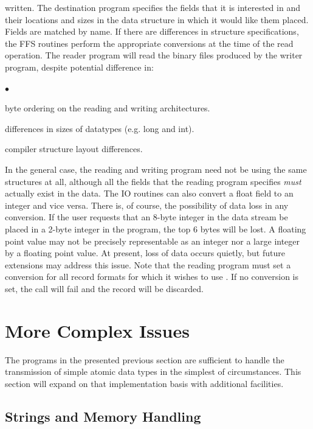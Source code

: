written.  The destination program specifies the fields that it is interested
in and their locations and sizes in the data structure in which it would like
them placed. Fields are matched by name.  If there are differences in
structure specifications, the FFS routines perform the appropriate
conversions at the time of the read operation.  The reader program will read
the binary files produced by the writer program, despite potential difference
in: 
\begin{list}{$\bullet$\hfill}{\let\makelabel\descriptionlabel\setlength{\itemsep}{0in}\setlength{\topsep}{0in}}
\item byte ordering on the reading and writing architectures.
\item differences in sizes of datatypes (e.g. long and int).
\item compiler structure layout differences.
\end{list}
In the general case, the reading and writing program need not be using the
same structures at all, although all the fields that the reading program
specifies {\em must} actually exist in the data.  The IO routines can also
convert a float field to an integer and vice versa.  There is, of
course, the possibility of data loss in any conversion.  If the user requests
that an 8-byte integer in the data stream be placed in a 2-byte integer in the
program, the top 6 bytes will be lost.  A floating point value may not be
precisely representable as an integer nor a large integer by a floating point
value.  At present, loss of data occurs quietly, but future extensions may
address this issue.  Note that the reading program must set a conversion
for all record formats for which it wishes to use .  If no
conversion is set, the  call will fail and the record will be
discarded.  

\section{More Complex Issues}
The programs in the presented previous section are sufficient to handle the
transmission of simple atomic data types in the simplest of circumstances.
This section will expand on that implementation basis with additional
facilities. 

\subsection{Strings and Memory Handling\label{stringmem}}

